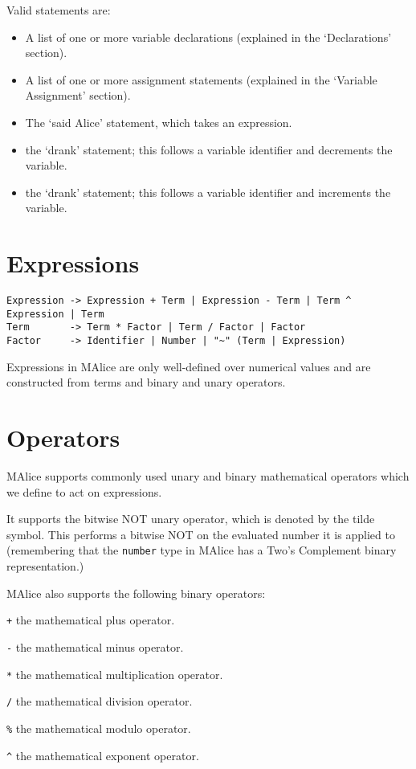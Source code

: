 \documentclass[a4wide, 11pt]{article}
\begin{document}
Valid statements are:
\begin{itemize}

\item A list of one or more variable declarations (explained in the `Declarations' section).
\item A list of one or more assignment statements (explained in the `Variable Assignment' section).
\item The `said Alice' statement, which takes an expression.
\item the `drank' statement; this follows a variable identifier and decrements the variable.
\item the `drank' statement; this follows a variable identifier and increments the variable.

\end{itemize}
  
\section{Expressions}

\begin{verbatim}
Expression -> Expression + Term | Expression - Term | Term ^ Expression | Term
Term       -> Term * Factor | Term / Factor | Factor
Factor     -> Identifier | Number | "~" (Term | Expression)

\end{verbatim}

Expressions in MAlice are only well-defined over numerical values and are constructed from terms and binary and unary operators.

\section{Operators}

MAlice supports commonly used unary and binary mathematical operators which we define to act on expressions.

It supports the bitwise NOT unary operator, which is denoted by the tilde symbol. This performs a bitwise NOT on the evaluated number it is applied to (remembering that the \texttt{number} type in MAlice has a Two's Complement binary representation.)

MAlice also supports the following binary operators:

\begin{list}{} {
\setlength{\labelsep}{0.75cm}
\setlength{\leftmargin}{2cm}
}

\item[\texttt{+}] the mathematical plus operator.
\item[\texttt{-}] the mathematical minus operator.
\item[\texttt{*}] the mathematical multiplication operator.
\item[\texttt{/}] the mathematical division operator.
\item[\texttt{\%}] the mathematical modulo operator.
\item[\texttt{\^}] the mathematical exponent operator.

\end{list}
\end{document}
